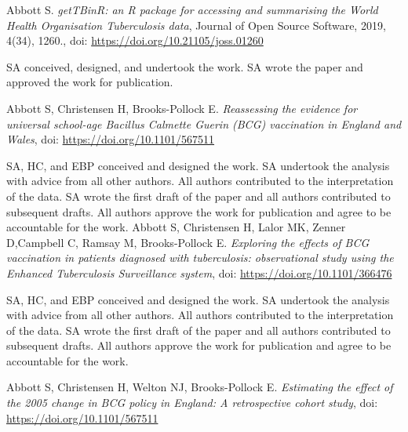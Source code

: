 \documentclass[11pt,twoside]{bristolthesis}
\begin{document}
      \begin{contribution}
      Abbott S. \emph{getTBinR: an R package for accessing and summarising the World Health Organisation Tuberculosis data}, Journal of Open Source Software, 2019, 4(34), 1260., doi: \url{https://doi.org/10.21105/joss.01260}
      
      \par
      
      SA conceived, designed, and undertook the work. SA wrote the paper and approved the work for publication.
      
      \par
      
      Abbott S, Christensen H, Brooks-Pollock E. \emph{Reassessing the evidence for universal school-age Bacillus Calmette Guerin (BCG) vaccination in England and Wales}, doi: \url{https://doi.org/10.1101/567511}
      
      \par
      
      SA, HC, and EBP conceived and designed the work. SA undertook the analysis with advice from all other authors. All authors contributed to the interpretation of the data. SA wrote the first draft of the paper and all authors contributed to subsequent drafts. All authors approve the work for publication and agree to be accountable for the work. Abbott S, Christensen H, Lalor MK, Zenner D,Campbell C, Ramsay M, Brooks-Pollock E. \emph{Exploring the effects of BCG vaccination in patients diagnosed with tuberculosis: observational study using the Enhanced Tuberculosis Surveillance system}, doi: \url{https://doi.org/10.1101/366476}
      
      \par
      
      SA, HC, and EBP conceived and designed the work. SA undertook the analysis with advice from all other authors. All authors contributed to the interpretation of the data. SA wrote the first draft of the paper and all authors contributed to subsequent drafts. All authors approve the work for publication and agree to be accountable for the work.
      
      \par
      
      Abbott S, Christensen H, Welton NJ, Brooks-Pollock E. \emph{Estimating the effect of the 2005 change in BCG policy in England: A retrospective cohort study}, doi: \url{https://doi.org/10.1101/567511}
      
      \par
      

\end{contribution}
\end{document}
